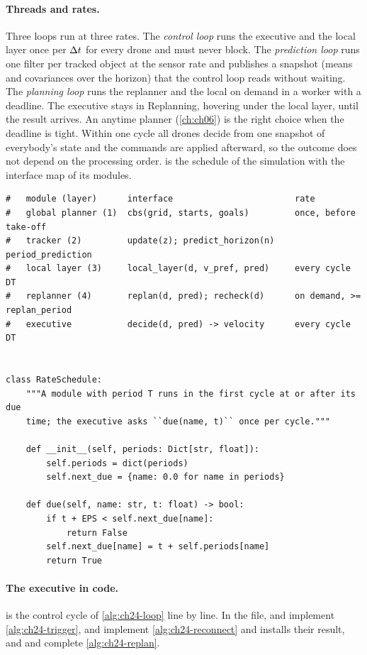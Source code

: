 \paragraph{Threads and rates.}
Three loops run at three rates. The \emph{control loop} runs the executive
and the local layer once per $\Delta t$ for every drone and must never block.
The \emph{prediction loop} runs one filter per tracked object at the sensor
rate and publishes a snapshot (means and covariances over the horizon) that
the control loop reads without waiting. The \emph{planning loop} runs the
replanner and the local \cbs on demand in a worker with a deadline. The
executive stays in Replanning, hovering under the local layer, until the
result arrives. An anytime planner (\cref{ch:ch06}) is the right choice
when the deadline is tight. Within one cycle all drones decide from one
snapshot of everybody's state and the commands are applied afterward, so
the outcome does not depend on the processing order. 
is the schedule of the simulation with the interface map of its modules.

\begin{lstlisting}[caption={The module map and the rate schedule (from \code{code/ch24\_hybrid.py}). Each module runs when its period has elapsed; the executive asks the schedule once per control cycle.},label={lst:ch24-rates}]
#   module (layer)      interface                        rate
#   global planner (1)  cbs(grid, starts, goals)         once, before take-off
#   tracker (2)         update(z); predict_horizon(n)    period_prediction
#   local layer (3)     local_layer(d, v_pref, pred)     every cycle DT
#   replanner (4)       replan(d, pred); recheck(d)      on demand, >= replan_period
#   executive           decide(d, pred) -> velocity      every cycle DT


class RateSchedule:
    """A module with period T runs in the first cycle at or after its due
    time; the executive asks ``due(name, t)`` once per cycle."""

    def __init__(self, periods: Dict[str, float]):
        self.periods = dict(periods)
        self.next_due = {name: 0.0 for name in periods}

    def due(self, name: str, t: float) -> bool:
        if t + EPS < self.next_due[name]:
            return False
        self.next_due[name] = t + self.periods[name]
        return True
\end{lstlisting}

\paragraph{The executive in code.}
 is the control cycle of \cref{alg:ch24-loop} line by
line. In the file,  and 
implement \cref{alg:ch24-trigger},  and 
implement \cref{alg:ch24-reconnect} and  installs
their result, and  and  complete
\cref{alg:ch24-replan}.



